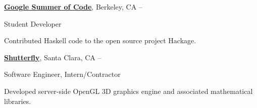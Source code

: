 \documentclass[letterpaper,MMMyyyy,nonstopmode]{simpleresumecv}
\begin{document}
\begin{Body}
\BigGap
\Entry
\href{https://summerofcode.withgoogle.com/archive/}
{\textbf{Google Summer of Code}},
Berkeley, CA
\hfill
{} --

\Gap
\BulletItem
Student Developer

\begin{Detail}
\SubBulletItem
Contributed Haskell code to the open source project Hackage.
\end{Detail}


\BigGap
\Entry
\href{http://www.shutterfly.com/}
{\textbf{Shutterfly}},
Santa Clara, CA
\hfill
{} --

\Gap
\BulletItem
Software Engineer, Intern/Contractor
\begin{Detail}
\SubBulletItem
Developed server-side OpenGL 3D graphics engine and associated mathematical libraries.
\end{Detail}



\end{Body}
\end{document}
